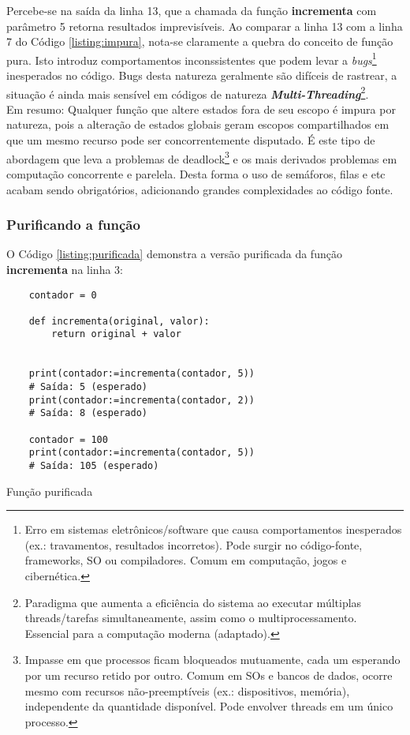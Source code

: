 Percebe-se na saída da linha 13, que a chamada da função \textbf{incrementa} com parâmetro 5 retorna resultados imprevisíveis. Ao comparar
a linha 13 com a linha 7 do Código \ref{listing:impura}, nota-se claramente a quebra do conceito de função pura. Isto introduz comportamentos inconssistentes
que podem levar a \textit{bugs}\footnote{
    Erro em sistemas eletrônicos/software que causa comportamentos inesperados (ex.: travamentos, resultados incorretos). Pode surgir no código-fonte, frameworks, SO ou compiladores. Comum em computação, jogos e cibernética\cite{wiki_bug}.
} inesperados no código. Bugs desta natureza geralmente são difíceis de rastrear, a situação é ainda
mais sensível em códigos de natureza \textit{\textbf{Multi-Threading}}\footnote{
    Paradigma que aumenta a eficiência do sistema ao executar múltiplas threads/tarefas simultaneamente, assim como o multiprocessamento. Essencial para a computação moderna\cite{wiki_multithreading} (adaptado).
}.\\
Em resumo: Qualquer função que altere estados fora de seu escopo é impura por natureza, pois a alteração de estados globais geram escopos compartilhados em que um mesmo recurso pode ser concorrentemente disputado.
É este tipo de abordagem que leva a problemas de deadlock\footnote{
    Impasse em que processos ficam bloqueados mutuamente, cada um esperando por um recurso retido por outro. Comum em SOs e bancos de dados, ocorre mesmo com recursos não-preemptíveis (ex.: dispositivos, memória), independente da quantidade disponível. Pode envolver threads em um único processo\cite{wiki_deadlock}.
} e os mais derivados problemas em computação concorrente e parelela. Desta forma o uso de semáforos, filas e etc acabam sendo obrigatórios, adicionando grandes complexidades ao código fonte.

\subsubsection{Purificando a função}
O Código \ref{listing:purificada} demonstra a versão purificada da função \textbf{incrementa} na linha 3:
\begin{listing}[!ht]
\begin{verbatim}
    contador = 0

    def incrementa(original, valor):
        return original + valor


    print(contador:=incrementa(contador, 5))
    # Saída: 5 (esperado)
    print(contador:=incrementa(contador, 2))
    # Saída: 8 (esperado)

    contador = 100
    print(contador:=incrementa(contador, 5))
    # Saída: 105 (esperado)
\end{verbatim}
\caption{Função purificada}
\label{listing:purificada}
\end{listing}\linebreak

